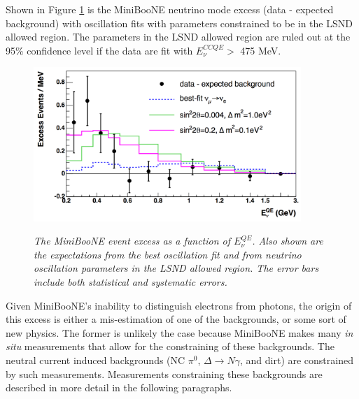 Shown in Figure \ref{MB_published_excess_fits_fig} is the MiniBooNE neutrino mode excess (data - expected background) with oscillation fits with parameters constrained to be in the LSND allowed region. The parameters in the LSND allowed region are ruled out at the 95\% confidence level if the data are fit with $E_\nu^{CCQE}>$ 475 MeV. \\

\begin{figure}[ht!]
\centering
	\includegraphics[width=0.9\textwidth]{Figures/MB_published_excess_fits.png} \\
\caption{\textit{The MiniBooNE event excess as a function of $E_\nu^{QE}$. Also shown are the expectations from the best oscillation fit and from neutrino oscillation parameters in the LSND allowed region. The error bars include both statistical and systematic errors.}}\label{MB_published_excess_fits_fig}
\end{figure}

Given MiniBooNE's inability to distinguish electrons from photons, the origin of this excess is either a mis-estimation of one of the backgrounds, or some sort of new physics. The former is unlikely the case because MiniBooNE makes many \textit{in situ} measurements that allow for the constraining of these backgrounds. The neutral current induced backgrounds (NC $\pi^0$, $\Delta\rightarrow N\gamma$, and dirt) are constrained by such measurements. Measurements constraining these backgrounds are described in more detail in the following paragraphs.\\


